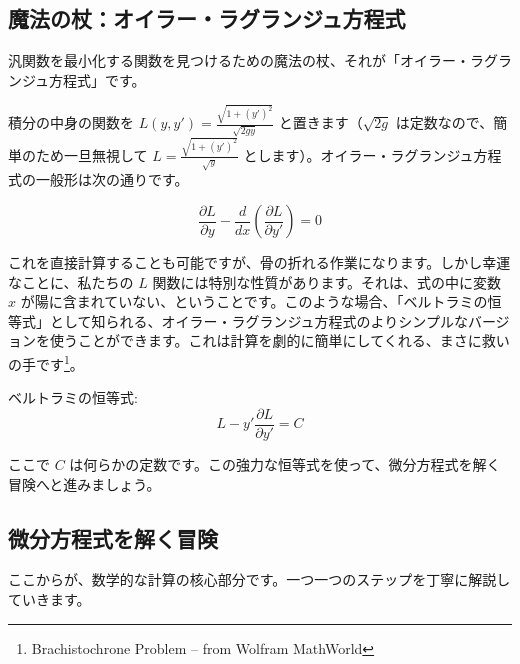 \documentclass[a4paper,12pt]{bxjsarticle}
\begin{document}
\subsection{魔法の杖：オイラー・ラグランジュ方程式}

汎関数を最小化する関数を見つけるための魔法の杖、それが「オイラー・ラグランジュ方程式」です。

積分の中身の関数を $L(y,y')=\frac{\sqrt{1+(y')^2}}{\sqrt{2gy}}$ と置きます（$\sqrt{2g}$ は定数なので、簡単のため一旦無視して $L=\frac{\sqrt{1+(y')^2}}{\sqrt{y}}$ とします）。オイラー・ラグランジュ方程式の一般形は次の通りです。

\begin{equation}
\frac{\partial L}{\partial y}-\frac{d}{dx}\left(\frac{\partial L}{\partial y'}\right)=0
\end{equation}

これを直接計算することも可能ですが、骨の折れる作業になります。しかし幸運なことに、私たちの $L$ 関数には特別な性質があります。それは、式の中に変数 $x$ が陽に含まれていない、ということです。このような場合、「ベルトラミの恒等式」として知られる、オイラー・ラグランジュ方程式のよりシンプルなバージョンを使うことができます。これは計算を劇的に簡単にしてくれる、まさに救いの手です\footnote{Brachistochrone Problem -- from Wolfram MathWorld}。

ベルトラミの恒等式:
\begin{equation}
L-y'\frac{\partial L}{\partial y'}=C
\end{equation}

ここで $C$ は何らかの定数です。この強力な恒等式を使って、微分方程式を解く冒険へと進みましょう。

\subsection{微分方程式を解く冒険}

ここからが、数学的な計算の核心部分です。一つ一つのステップを丁寧に解説していきます。
\end{document}
